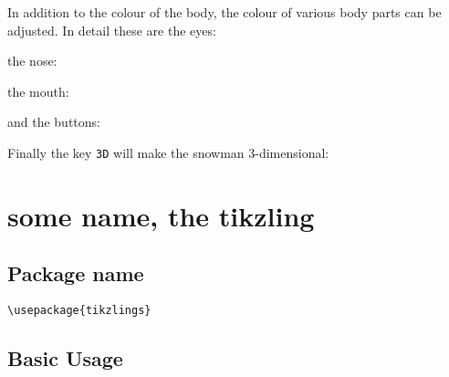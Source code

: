 \documentclass[parskip=half]{scrartcl}
\begin{document}
\begin{tcblisting}{}
\snowman[body=SteelBlue]
\end{tcblisting}

In addition to the colour of the body, the colour of various body parts can be adjusted. In detail these are the eyes:

\begin{tcblisting}{}
\snowman[eye=red]
\end{tcblisting}

the nose:

\begin{tcblisting}{}
\snowman[nose=red]
\end{tcblisting}

the mouth:

\begin{tcblisting}{}
\snowman[mouth=red]
\end{tcblisting}

and the buttons:

\begin{tcblisting}{}
\snowman[buttons=red]
\end{tcblisting}

Finally the key \lstinline|3D| will make the snowman 3-dimensional:

\begin{tcblisting}{}
\snowman[3D]
\end{tcblisting}

\clearpage
\section[\textbackslash tikzling]{some name, the tikzling}

\subsection{Package name}

\begin{tcolorbox}[lower separated=false, lefthand width=.8\linewidth]
\vspace*{0.5cm}
\lstinline|\usepackage{tikzlings}|
\vspace*{0.5cm}
\end{tcolorbox}

\subsection{Basic Usage}

\begin{tcblisting}{}
\tikzling
\end{tcblisting}
\end{document}
